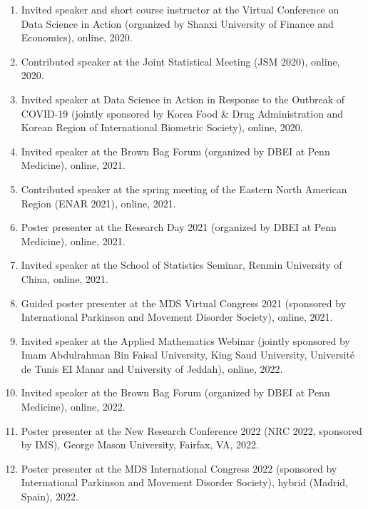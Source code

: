 \documentclass[12pt]{article}
\begin{document}
\begin{enumerate}
		\item Invited speaker and short course instructor at the Virtual Conference on Data Science in Action (organized by Shanxi 	University of Finance and Economics), online, 2020.
		
		\item Contributed speaker at the Joint Statistical Meeting (JSM 2020), online, 2020.
		
		\item Invited speaker at Data Science in Action in Response to the Outbreak of COVID-19 (jointly sponsored by Korea Food \& Drug Administration and	Korean Region of International Biometric Society), online, 2020.
		
		\item Invited speaker at the Brown Bag Forum (organized by DBEI at Penn Medicine), online, 2021.
		
		\item Contributed speaker at the spring meeting of the Eastern North American Region (ENAR 2021), online, 2021.
		
		\item Poster presenter at the Research Day 2021 (organized by DBEI at Penn Medicine), online, 2021.
		
		\item Invited speaker at the School of Statistics Seminar, 
		Renmin University of China, online, 2021.
		
		\item Guided poster presenter at the MDS Virtual Congress 2021 (sponsored by International Parkinson and Movement Disorder Society), online, 2021.
		
		\item Invited speaker at the Applied Mathematics Webinar 
		(jointly sponsored by Imam Abdulrahman Bin Faisal University, King Saud University, Universit\'{e} de Tunis EI Manar and University of Jeddah), online, 2022.
		
		\item Invited speaker at the Brown Bag Forum (organized by DBEI at Penn Medicine), online, 2022.
		
		\item Poster presenter at the New Research Conference 2022 
		(NRC 2022, sponsored by IMS), George Mason University, Fairfax, VA, 2022.
	
		\item Poster presenter at the MDS International Congress 2022 (sponsored by International Parkinson and Movement Disorder Society), hybrid (Madrid, Spain), 2022.
		

\end{enumerate}
\end{document}
